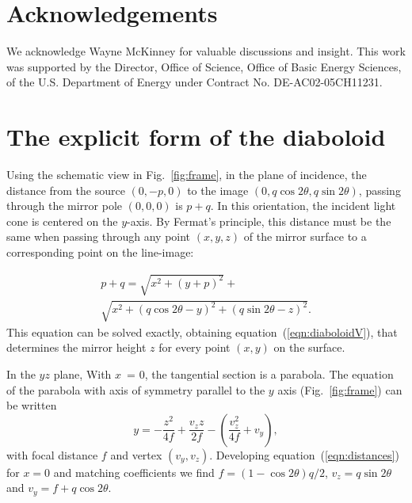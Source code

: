 \documentclass[preprint]{iucr}       %
\begin{document}

\vspace{5mm}
\section{Acknowledgements}    
 
We acknowledge Wayne McKinney for valuable discussions and insight.
This work was supported by the Director, Office of Science, Office of Basic Energy Sciences, of the U.S. Department of Energy under Contract No. DE-AC02-05CH11231.

\appendix

\section{The explicit form of the diaboloid }
\label{appendix:diaboloid}

Using the schematic view in Fig.~\ref{fig:frame}, in the plane of incidence, the distance from the source $(0,-p,0)$ to the image $(0,q \cos2\theta, q \sin2\theta)$, passing through the mirror pole $(0,0,0)$ is $p+q$. In this orientation, the incident light cone is centered on the $y$-axis. By Fermat's principle, this distance must be the same when passing through any point $(x,y,z)$ of the mirror surface to a corresponding point on the line-image:

\begin{multline}
\label{eqn:distances}
p + q = 
\sqrt{x^2 + (y + p)^2} + \\
\sqrt{x^2 + (q \cos2 \theta - y)^2 + (q \sin2 \theta - z)^2}.
\end{multline}
This equation can be solved exactly, obtaining equation~(\ref{eqn:diaboloidV}), that determines the mirror height $z$ for every point $(x,y)$ on the surface.

In the $yz$ plane, With $x$~= 0, the tangential section is a parabola. The equation of the parabola with axis of symmetry parallel to the $y$ axis (Fig.~\ref{fig:frame}) can be written 
\begin{equation}
y = -\frac{z^2}{4 f} + \frac{v_z z}{2 f} - \left(\frac{v_z^2}{4 f} + v_y\right),
\end{equation}
\noindent with focal distance $f$ and vertex $(v_y,v_z)$. Developing equation~(\ref{eqn:distances}) for $x=0$ and matching coefficients we find $f=(1-\cos2\theta)q/2$, $v_z=q \sin2\theta$ and $v_y=f+q\cos2\theta$.
\end{document}
